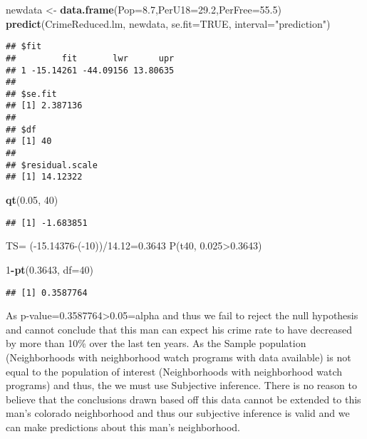 \documentclass[]{article}
\newenvironment{Shaded}{\begin{snugshade}}{\end{snugshade}}
\newcommand{\KeywordTok}[1]{\textcolor[rgb]{0.13,0.29,0.53}{\textbf{#1}}}
\newcommand{\DataTypeTok}[1]{\textcolor[rgb]{0.13,0.29,0.53}{#1}}
\newcommand{\DecValTok}[1]{\textcolor[rgb]{0.00,0.00,0.81}{#1}}
\newcommand{\FloatTok}[1]{\textcolor[rgb]{0.00,0.00,0.81}{#1}}
\newcommand{\StringTok}[1]{\textcolor[rgb]{0.31,0.60,0.02}{#1}}
\newcommand{\OtherTok}[1]{\textcolor[rgb]{0.56,0.35,0.01}{#1}}
\newcommand{\OperatorTok}[1]{\textcolor[rgb]{0.81,0.36,0.00}{\textbf{#1}}}
\newcommand{\NormalTok}[1]{#1}
\begin{document}
\begin{Shaded}
\begin{Highlighting}[]
\NormalTok{newdata <-}\StringTok{ }\KeywordTok{data.frame}\NormalTok{(}\DataTypeTok{Pop=}\FloatTok{8.7}\NormalTok{,}\DataTypeTok{PerU18=}\FloatTok{29.2}\NormalTok{,}\DataTypeTok{PerFree=}\FloatTok{55.5}\NormalTok{)}
\KeywordTok{predict}\NormalTok{(CrimeReduced.lm, newdata, }\DataTypeTok{se.fit=}\OtherTok{TRUE}\NormalTok{, }\DataTypeTok{interval=}\StringTok{"prediction"}\NormalTok{)}
\end{Highlighting}
\end{Shaded}

\begin{verbatim}
## $fit
##         fit       lwr      upr
## 1 -15.14261 -44.09156 13.80635
## 
## $se.fit
## [1] 2.387136
## 
## $df
## [1] 40
## 
## $residual.scale
## [1] 14.12322
\end{verbatim}

\begin{Shaded}
\begin{Highlighting}[]
\KeywordTok{qt}\NormalTok{(}\FloatTok{0.05}\NormalTok{, }\DecValTok{40}\NormalTok{)}
\end{Highlighting}
\end{Shaded}

\begin{verbatim}
## [1] -1.683851
\end{verbatim}

TS= (-15.14376-(-10))/14.12=0.3643 P(t40, 0.025\textgreater{}0.3643)

\begin{Shaded}
\begin{Highlighting}[]
\DecValTok{1}\OperatorTok{-}\KeywordTok{pt}\NormalTok{(}\FloatTok{0.3643}\NormalTok{, }\DataTypeTok{df=}\DecValTok{40}\NormalTok{)}
\end{Highlighting}
\end{Shaded}

\begin{verbatim}
## [1] 0.3587764
\end{verbatim}

As p-value=0.3587764\textgreater{}0.05=alpha and thus we fail to reject
the null hypothesis and cannot conclude that this man can expect his
crime rate to have decreased by more than 10\% over the last ten years.
As the Sample population (Neighborhoods with neighborhood watch programs
with data available) is not equal to the population of interest
(Neighborhoods with neighborhood watch programs) and thus, the we must
use Subjective inference. There is no reason to believe that the
conclusions drawn based off this data cannot be extended to this man's
colorado neighborhood and thus our subjective inference is valid and we
can make predictions about this man's neighborhood.
\end{document}
